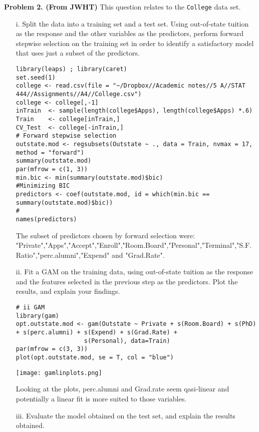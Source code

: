 \documentclass[11pt]{report}
\begin{document}
\noindent
\newpage
{\bf Problem 2. (From JWHT)} This question relates to the {\tt College} data set.
\begin{itemize}
\item[i. ] Split the data into a training set and a test set. Using out-of-state tuition as the response and the other variables as the predictors, perform forward stepwise selection on the training set in order to identify a satisfactory model that uses just a subset of the predictors.

\begin{verbatim}
library(leaps) ; library(caret)
set.seed(1)
college <- read.csv(file = "~/Dropbox//Academic notes//5 A//STAT 444//Assignments//A4//College.csv")
college <- college[,-1]
inTrain  <- sample(length(college$Apps), length(college$Apps) *.6)
Train    <- college[inTrain,]
CV_Test  <- college[-inTrain,]
# Forward stepwise selection
outstate.mod <- regsubsets(Outstate ~ ., data = Train, nvmax = 17, method = "forward")
summary(outstate.mod)
par(mfrow = c(1, 3))
min.bic <- min(summary(outstate.mod)$bic)
#Minimizing BIC
predictors <- coef(outstate.mod, id = which(min.bic == summary(outstate.mod)$bic))
#
names(predictors)
\end{verbatim}

The subset of predictors chosen by forward selection were: "Private","Apps","Accept","Enroll","Room.Board","Personal","Terminal","S.F.Ratio","perc.alumni","Expend" and "Grad.Rate".

\item[ii. ] Fit a GAM on the training data, using out-of-state tuition as the response and the features selected in the previous step as the predictors. Plot the results, and explain your findings.

\begin{verbatim}
# ii GAM
library(gam)
opt.outstate.mod <- gam(Outstate ~ Private + s(Room.Board) + s(PhD) + s(perc.alumni) + s(Expend) + s(Grad.Rate) +
                   s(Personal), data=Train)
par(mfrow = c(3, 3))
plot(opt.outstate.mod, se = T, col = "blue")
\end{verbatim}

\texttt{[image: gamlinplots.png]}

Looking at the plots, perc.alumni and Grad.rate seem qasi-linear and potentially a linear fit is more suited to those variables.

\item[iii. ] Evaluate the model obtained on the test set, and explain the results obtained.


\end{itemize}
\end{document}
